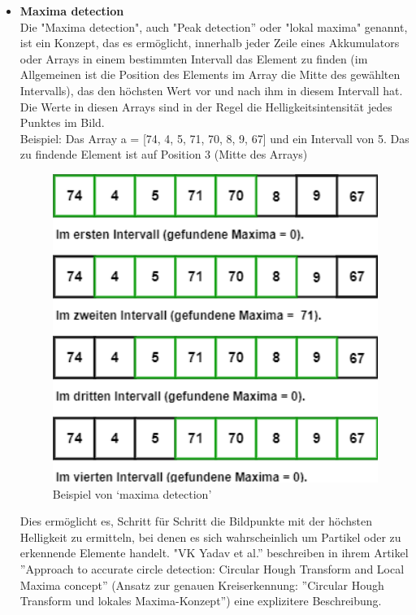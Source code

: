 \begin{itemize}
\item \textbf{Maxima detection}\\
Die "Maxima detection", auch "Peak detection'' oder "lokal maxima" genannt, ist ein Konzept, das es ermöglicht, innerhalb jeder Zeile eines Akkumulators oder Arrays in einem bestimmten Intervall das Element zu finden (im Allgemeinen ist die Position des Elements im Array die Mitte des gewählten Intervalls), das den höchsten Wert vor und nach ihm in diesem Intervall hat.  Die Werte in diesen Arrays sind in der Regel die Helligkeitsintensität jedes Punktes im Bild.\\
Beispiel: Das Array a = [74, 4, 5, 71, 70, 8, 9, 67] und ein Intervall von 5. Das zu findende Element ist auf Position 3 (Mitte des Arrays)


\begin{figure}[H]
    \centering
    \includegraphics[width=1\textwidth]{Grafiken/grundlage/maxima Beispiel.png}
    \caption{Beispiel von `maxima detection'}
\end{figure}

Dies ermöglicht es, Schritt für Schritt die Bildpunkte mit der höchsten Helligkeit zu ermitteln, bei denen es sich wahrscheinlich um Partikel oder zu erkennende Elemente handelt.
"VK Yadav et al.'' beschreiben in ihrem Artikel ''Approach to accurate circle detection: Circular Hough Transform and Local Maxima concept'' (Ansatz zur genauen Kreiserkennung: ''Circular Hough Transform und lokales Maxima-Konzept'') 
\cite{yadav2014approach} eine explizitere Beschreibung.



\end{itemize}
